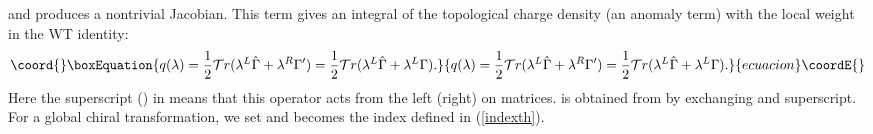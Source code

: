 \documentclass[a4paper,prl,showpacs,twocolumn]{revtex4}
\begin{document}
and produces a nontrivial Jacobian.
This term gives an integral of the 
 topological charge density (an anomaly term)
with the local weight \myHighlight{$\lambda$}\coordHE{}
in the WT identity:
\begin{equation}\coord{}\boxEquation{
q(\lambda)=\frac{1}{2}{\cal T}r(\lambda^L \hat{\Gamma} +\lambda^R \Gamma')
= \frac{1}{2}{\cal T}r(\lambda^L \hat{\Gamma} +\lambda^L \Gamma).
\label{topchargedensity}
}{
q(\lambda)=\frac{1}{2}{\cal T}r(\lambda^L \hat{\Gamma} +\lambda^R \Gamma')
= \frac{1}{2}{\cal T}r(\lambda^L \hat{\Gamma} +\lambda^L \Gamma).
}{ecuacion}\coordE{}\end{equation}
Here the superscript \coordHE{} (\coordHE{}) in \myHighlight{$\lambda$}\coordHE{} means that this
operator acts from the left (right) on matrices.
\coordHE{} is obtained from \myHighlight{$\Gamma$}\coordHE{} 
by exchanging \coordHE{} and \coordHE{} superscript.
For a global chiral transformation, we set \coordHE{} and
\coordHE{} becomes the index defined in (\ref{indexth}).
\end{document}
